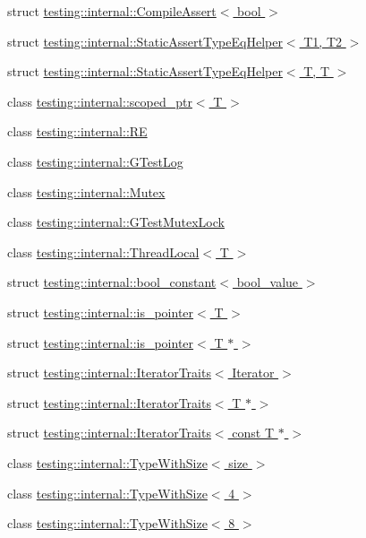 \begin{DoxyCompactItemize}
\item 
struct \hyperlink{structtesting_1_1internal_1_1_compile_assert}{testing\+::internal\+::\+Compile\+Assert$<$ bool $>$}
\item 
struct \hyperlink{structtesting_1_1internal_1_1_static_assert_type_eq_helper}{testing\+::internal\+::\+Static\+Assert\+Type\+Eq\+Helper$<$ T1, T2 $>$}
\item 
struct \hyperlink{structtesting_1_1internal_1_1_static_assert_type_eq_helper_3_01_t_00_01_t_01_4}{testing\+::internal\+::\+Static\+Assert\+Type\+Eq\+Helper$<$ T, T $>$}
\item 
class \hyperlink{classtesting_1_1internal_1_1scoped__ptr}{testing\+::internal\+::scoped\+\_\+ptr$<$ T $>$}
\item 
class \hyperlink{classtesting_1_1internal_1_1_r_e}{testing\+::internal\+::\+RE}
\item 
class \hyperlink{classtesting_1_1internal_1_1_g_test_log}{testing\+::internal\+::\+G\+Test\+Log}
\item 
class \hyperlink{classtesting_1_1internal_1_1_mutex}{testing\+::internal\+::\+Mutex}
\item 
class \hyperlink{classtesting_1_1internal_1_1_g_test_mutex_lock}{testing\+::internal\+::\+G\+Test\+Mutex\+Lock}
\item 
class \hyperlink{classtesting_1_1internal_1_1_thread_local}{testing\+::internal\+::\+Thread\+Local$<$ T $>$}
\item 
struct \hyperlink{structtesting_1_1internal_1_1bool__constant}{testing\+::internal\+::bool\+\_\+constant$<$ bool\+\_\+value $>$}
\item 
struct \hyperlink{structtesting_1_1internal_1_1is__pointer}{testing\+::internal\+::is\+\_\+pointer$<$ T $>$}
\item 
struct \hyperlink{structtesting_1_1internal_1_1is__pointer_3_01_t_01_5_01_4}{testing\+::internal\+::is\+\_\+pointer$<$ T $\ast$ $>$}
\item 
struct \hyperlink{structtesting_1_1internal_1_1_iterator_traits}{testing\+::internal\+::\+Iterator\+Traits$<$ Iterator $>$}
\item 
struct \hyperlink{structtesting_1_1internal_1_1_iterator_traits_3_01_t_01_5_01_4}{testing\+::internal\+::\+Iterator\+Traits$<$ T $\ast$ $>$}
\item 
struct \hyperlink{structtesting_1_1internal_1_1_iterator_traits_3_01const_01_t_01_5_01_4}{testing\+::internal\+::\+Iterator\+Traits$<$ const T $\ast$ $>$}
\item 
class \hyperlink{classtesting_1_1internal_1_1_type_with_size}{testing\+::internal\+::\+Type\+With\+Size$<$ size $>$}
\item 
class \hyperlink{classtesting_1_1internal_1_1_type_with_size_3_014_01_4}{testing\+::internal\+::\+Type\+With\+Size$<$ 4 $>$}
\item 
class \hyperlink{classtesting_1_1internal_1_1_type_with_size_3_018_01_4}{testing\+::internal\+::\+Type\+With\+Size$<$ 8 $>$}
\end{DoxyCompactItemize}
